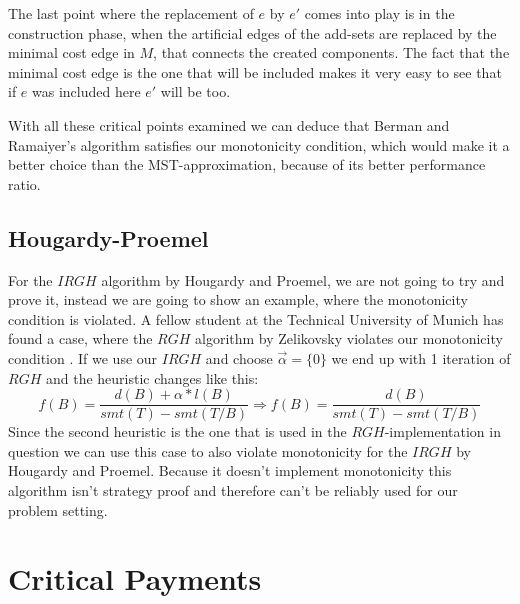The last point where the replacement of $e$ by $e'$ comes into play is in the construction phase, when the artificial edges of the add-sets are replaced by the minimal cost edge in $M$, that connects the created components. The fact that the minimal cost edge is the one that will be included makes it very easy to see that if $e$ was included here $e'$ will be too.

With all these critical points examined we can deduce that Berman and Ramaiyer's algorithm satisfies our monotonicity condition, which would make it a better choice than the MST-approximation, because of its better performance ratio. 
\subsection{Hougardy-Proemel}

For the $IRGH$ algorithm by Hougardy and Proemel, we are not going to try and prove it, instead we are going to show an example, where the monotonicity condition is violated. A fellow student at the Technical University of Munich has found a case, where the $RGH$ algorithm by Zelikovsky \cite{zelikovsky1996better} violates our monotonicity condition \cite{guggenbichler20}. If we use our $IRGH$ and choose $\vec{\alpha}=\{ 0\}$ we end up with 1 iteration of $RGH$ and the heuristic changes like this: 
$$f(B) = \frac{d(B) + \alpha * l(B)}{smt(T)-smt(T/B)} \Rightarrow f(B) = \frac{d(B)}{smt(T)-smt(T/B)}$$
Since the second heuristic is the one that is used in the $RGH$-implementation in question we can use this case to also violate monotonicity for the $IRGH$ by Hougardy and Proemel. Because it doesn't implement monotonicity this algorithm isn't strategy proof and therefore can't be reliably used for our problem setting. 

\section{Critical Payments}

